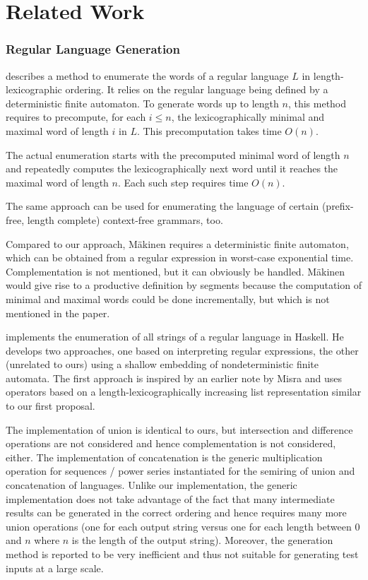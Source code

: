 \section{Related Work}
\label{sec:related-work}

\subsubsection*{Regular Language Generation}

\citet{DBLP:journals/actaC/Makinen97} describes a method to enumerate
the words of a regular language $L$ in length-lexicographic
ordering. It relies on the regular language being defined by a
deterministic finite automaton. To generate words up to length $n$,
this method requires to precompute, for each $i\le n$, the
lexicographically minimal and maximal word of length $i$ in $L$. This
precomputation takes time $O(n)$.

The actual enumeration starts with the precomputed minimal word of
length $n$ and repeatedly computes the lexicographically next word
until it reaches the maximal word of length $n$. Each such step requires time $O(n)$. 

The same approach can be used for enumerating the language of certain
(prefix-free, length complete) context-free grammars, too.

Compared to our approach, M{\"{a}}kinen requires a deterministic
finite automaton, which can be obtained from a regular expression in
worst-case exponential time. Complementation is not mentioned, but it
can obviously be handled. M{\"{a}}kinen would give rise to a
productive definition by segments because the computation of minimal
and maximal words could be done incrementally, but which is not mentioned
in the paper.


\citet{DBLP:journals/jfp/McIlroy04} implements the enumeration of all
strings of a regular language in Haskell. He develops two approaches,
one based on interpreting regular expressions, the other (unrelated to
ours) using a shallow embedding of nondeterministic finite
automata. The first approach is inspired by an earlier note by Misra
\cite{misra11:_enumer_strin_regul_expres} and uses operators based on
a length-lexicographically increasing list representation similar to
our first proposal.

The implementation of union is identical to ours, but intersection and
difference operations are not considered and hence complementation is
not considered, either. The implementation of concatenation is the
generic multiplication operation for sequences / power series
\cite{DBLP:journals/jfp/McIlroy99} instantiated for the semiring
of union and concatenation of languages. Unlike our implementation, the generic 
implementation does not take advantage of the fact that many
intermediate results can be generated in the correct ordering and hence
requires many more union operations (one for each output string versus
one for each length between $0$ and $n$ where $n$ is the length of
the output string).  Moreover, the generation method is reported to
be very inefficient and thus not suitable for generating test inputs
at a large scale.

